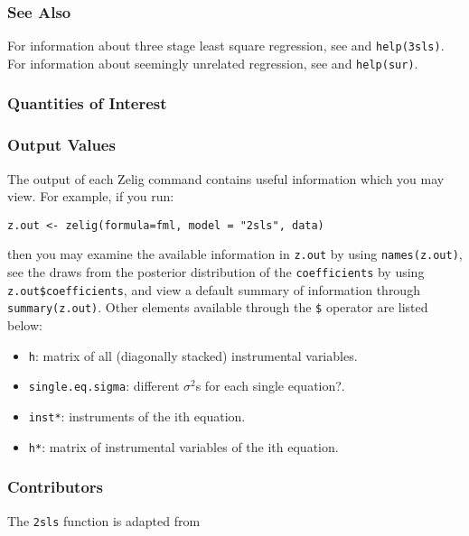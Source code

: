 \documentclass[12pt]{book}%
\begin{document}
\subsubsection{See Also}
For information about three stage least square regression, see 
 and \texttt{help(3sls)}.
For information about seemingly unrelated regression, see
 and \texttt{help(sur)}.
\subsubsection{Quantities of Interest}
\subsubsection{Output Values}
The output of each Zelig command contains useful information which you may
view. For example, if you run:
\begin{verbatim}
z.out <- zelig(formula=fml, model = "2sls", data)
\end{verbatim}
\noindent then you may examine the available information in \texttt{z.out} by
using \texttt{names(z.out)}, see the draws from the posterior distribution of
the \texttt{coefficients} by using \texttt{z.out\$coefficients}, and view a default
summary of information through \texttt{summary(z.out)}. Other elements
available through the \texttt{\$} operator are listed below:
\begin{itemize}
\item \texttt{h}: matrix of all (diagonally stacked) instrumental variables.
\item \texttt{single.eq.sigma}: different $\sigma^2$s for each single equation?.
\end{itemize}



\begin{itemize}
\item \texttt{inst*}: instruments of the ith equation.
\item \texttt{h*}: matrix of instrumental variables of the ith equation. 
\end{itemize}
\subsubsection{Contributors}
The \texttt{2sls} function is adapted from 
\end{document}
